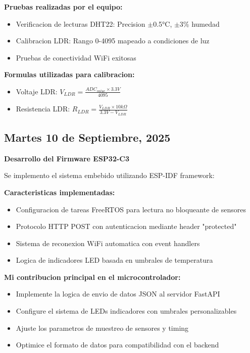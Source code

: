 \documentclass[11pt,letterpaper]{article}
\begin{document}
\textbf{Pruebas realizadas por el equipo:}
\begin{itemize}
    \item Verificacion de lecturas DHT22: Precision $\pm$0.5°C, $\pm$3\% humedad
    \item Calibracion LDR: Rango 0-4095 mapeado a condiciones de luz
    \item Pruebas de conectividad WiFi exitosas
\end{itemize}

\textbf{Formulas utilizadas para calibracion:}
\begin{itemize}
    \item Voltaje LDR: $V_{LDR} = \frac{ADC_{value} \times 3.3V}{4095}$
    \item Resistencia LDR: $R_{LDR} = \frac{V_{LDR} \times 10k\Omega}{3.3V - V_{LDR}}$
\end{itemize}

\subsection{Martes 10 de Septiembre, 2025}
\textbf{Desarrollo del Firmware ESP32-C3}

Se implemento el sistema embebido utilizando ESP-IDF framework:

\textbf{Caracteristicas implementadas:}
\begin{itemize}
    \item Configuracion de tareas FreeRTOS para lectura no bloqueante de sensores
    \item Protocolo HTTP POST con autenticacion mediante header "protected"
    \item Sistema de reconexion WiFi automatica con event handlers
    \item Logica de indicadores LED basada en umbrales de temperatura
\end{itemize}

\textbf{Mi contribucion principal en el microcontrolador:}
\begin{itemize}
    \item Implemente la logica de envio de datos JSON al servidor FastAPI
    \item Configure el sistema de LEDs indicadores con umbrales personalizables
    \item Ajuste los parametros de muestreo de sensores y timing
    \item Optimice el formato de datos para compatibilidad con el backend
\end{itemize}
\end{document}
